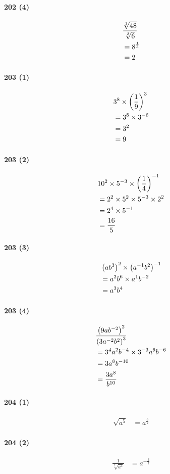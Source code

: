 \documentclass[fleqn,a4j,dvipdfmx,uplatex,twocolumn]{jsarticle}
\def\nr{\notag\\}%
\begin{document}
\paragraph{202 (4)}
\begin{align*}
  &\frac{\sqrt[3]{48}}{\sqrt[3]{6}} \nr
  &= 8^{\frac{1}{3}} \nr
  &= 2
\end{align*}

\paragraph{203 (1)}
\begin{align*}
  &3^8 \times \left(\frac{1}{9}\right)^3 \nr
  &= 3^8 \times 3^{-6} \nr
  &= 3^2 \nr
  &= 9
\end{align*}

\paragraph{203 (2)}
\begin{align*}
  &10^2 \times 5^{-3} \times \left(\frac{1}{4}\right)^{-1} \nr
  &= 2^2 \times 5^2 \times 5^{-3} \times 2^2 \nr
  &= 2^4 \times 5^{-1} \nr
  &= \frac{16}{5}
\end{align*}

\paragraph{203 (3)}
\begin{align*}
  &\left(ab^3\right)^2 \times \left(a^{-1}b^2\right)^{-1} \nr
  &= a^2b^6 \times a^1b^{-2} \nr
  &= a^3b^4
\end{align*}

\paragraph{203 (4)}
\begin{align*}
  &\frac{\left(9ab^{-2}\right)^2}{\left(3a^{-2}b^2\right)^3} \nr
  &= 3^4a^2b^{-4} \times 3^{-3}a^6b^{-6} \nr
  &= 3a^8b^{-10} \nr
  &= \frac{3a^8}{b^{10}}
\end{align*}

\paragraph{204 (1)}
\begin{align*}
  \sqrt{a^5} &= a^{\frac{5}{2}}
\end{align*}

\paragraph{204 (2)}
\begin{align*}
  \frac{1}{\sqrt[7]{a^3}} &= a^{-\frac{3}{7}}
\end{align*}
\end{document}
